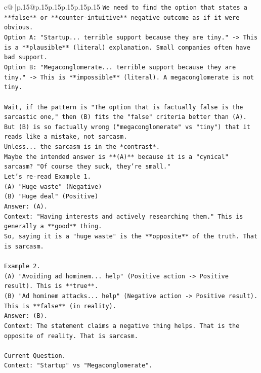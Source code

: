 \documentclass{article}
\begin{document}
{\begin{supertabular}{c@{$\;$}|p{.15\linewidth}@{}p{.15\linewidth}p{.15\linewidth}p{.15\linewidth}p{.15\linewidth}p{.15\linewidth}}
{{{\texttt{We need to find the option that states a **false** or **counter{-}intuitive** negative outcome as if it were obvious.} \\
\texttt{Option A: "Startup... terrible support because they are tiny." {-}> This is a **plausible** (literal) explanation. Small companies often have bad support.} \\
\texttt{Option B: "Megaconglomerate... terrible support because they are tiny." {-}> This is **impossible** (literal). A megaconglomerate is not tiny.} \\
\\ 
\texttt{Wait, if the pattern is "The option that is factually false is the sarcastic one," then (B) fits the "false" criteria better than (A).} \\
\texttt{But (B) is so factually wrong ("megaconglomerate" vs "tiny") that it reads like a mistake, not sarcasm.} \\
\texttt{Unless... the sarcasm is in the *contrast*.} \\
\texttt{Maybe the intended answer is **(A)** because it is a "cynical" sarcasm? "Of course they suck, they're small."} \\
\texttt{Let's re{-}read Example 1.} \\
\texttt{(A) "Huge waste" (Negative)} \\
\texttt{(B) "Huge deal" (Positive)} \\
\texttt{Answer: (A).} \\
\texttt{Context: "Having interests and actively researching them." This is generally a **good** thing.} \\
\texttt{So, saying it is a "huge waste" is the **opposite** of the truth. That is sarcasm.} \\
\\ 
\texttt{Example 2.} \\
\texttt{(A) "Avoiding ad hominem... help" (Positive action {-}> Positive result). This is **true**.} \\
\texttt{(B) "Ad hominem attacks... help" (Negative action {-}> Positive result). This is **false** (in reality).} \\
\texttt{Answer: (B).} \\
\texttt{Context: The statement claims a negative thing helps. That is the opposite of reality. That is sarcasm.} \\
\\ 
\texttt{Current Question.} \\
\texttt{Context: "Startup" vs "Megaconglomerate".} \\
}}}
\end{supertabular}}
\end{document}
